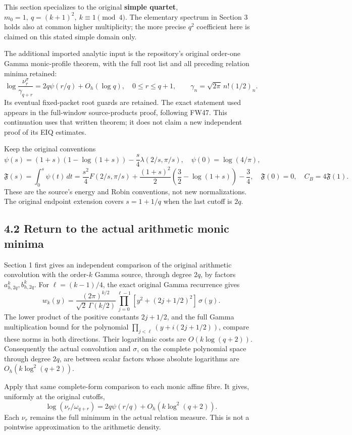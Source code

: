 This section specializes to the original \textbf{simple quartet}, \(m_0=1,\ q=(k+1)^2,\ k\equiv1\pmod4\). The elementary spectrum in Section 3 holds also at common higher multiplicity; the more precise \(q^2\) coefficient here is claimed on this stated simple domain only.

The additional imported analytic input is the repository's original order-one Gamma monic-profile theorem, with the full root list and all preceding relation minima retained: \[
 \log\frac{\nu_r^\sigma}{\gamma_{q+r}}
 =2q\psi(r/q)+O_h(\log q),\quad0\le r\le q+1,\qquad
 \gamma_n=\sqrt{2\pi}\,n!(1/2)_n. \tag{V1}
\] Its eventual fixed-packet root guards are retained. The exact statement used appears in the full-window source-products proof, following FW47. This continuation uses that written theorem; it does not claim a new independent proof of its EIQ estimates.

Keep the original conventions \[
 \psi(s)=(1+s)(1-\log(1+s))-\frac{s}{4}\lambda(2/s,\pi/s),
 \quad \psi(0)=\log(4/\pi),
\] \[
 \mathfrak F(s)=\int_0^s\psi(t)\,dt
 =\frac{s^2}{4}F(2/s,\pi/s)
  +\frac{(1+s)^2}{2}\left(\frac32-\log(1+s)\right)-\frac34,
 \quad \mathfrak F(0)=0,
 \quad C_B=4\mathfrak F(1). \tag{V2}
\] These are the source's energy and Robin conventions, not new normalizations. The original endpoint extension covers \(s=1+1/q\) when the last cutoff is \(2q\).

\subsection{4.2 Return to the actual arithmetic monic minima}\label{return-to-the-actual-arithmetic-monic-minima}

Section 1 first gives an independent comparison of the original arithmetic convolution with the order-\(k\) Gamma source, through degree \(2q\), by factors \(a_{h,2q}^k,b_{h,2q}^k\). For \(\ell=(k-1)/4\), the exact original Gamma recurrence gives \[
 w_k(y)=\frac{(2\pi)^{k/2}}{\sqrt2\,\Gamma(k/2)}
 \prod_{j=0}^{\ell-1}[y^2+(2j+1/2)^2]\,\sigma(y). \tag{V3}
\] The lower product of the positive constants \(2j+1/2\), and the full Gamma multiplication bound for the polynomial \(\prod_{j<\ell}(y+i(2j+1/2))\), compare these norms in both directions. Their logarithmic costs are \(O(k\log(q+2))\). Consequently the actual convolution and \(\sigma\), on the complete polynomial space through degree \(2q\), are between scalar factors whose absolute logarithms are \(O_h(k\log^2(q+2))\).

Apply that same complete-form comparison to each monic affine fibre. It gives, uniformly at the original cutoffs, \[
 \log(\nu_r/\omega_{q+r})
 =2q\psi(r/q)+O_h(k\log^2(q+2)). \tag{V4}
\] Each \(\nu_r\) remains the full minimum in the actual relation measure. This is not a pointwise approximation to the arithmetic density.

